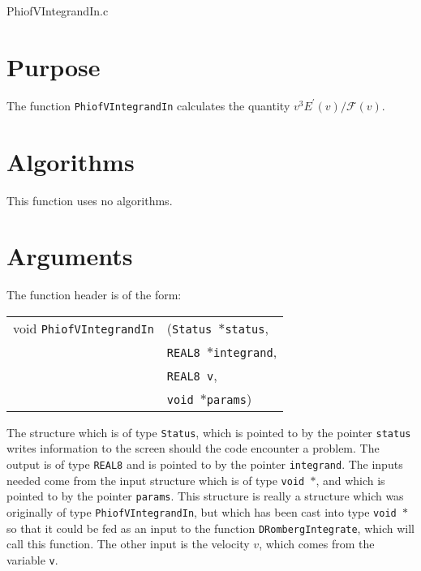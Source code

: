 \documentclass[12pt]{article}
\begin{document}
\huge
\begin{center}
PhiofVIntegrandIn.c
\end{center}
\normalsize
\vspace{10mm}

\section{Purpose}

The function \texttt{PhiofVIntegrandIn} calculates the quantity $v^{3} E^{\prime}(v)/\mathcal{F}(v)$.





\section{Algorithms}

This function uses no algorithms.


\section{Arguments}

The function header is of the form:

\vspace{5mm}

\begin{tabular}{ll}
void \texttt{PhiofVIntegrandIn}&(\texttt{Status $\ast$status},     \\
                                   &\texttt{REAL8 $\ast$integrand}, \\
                                   &\texttt{REAL8 v}, \\
                                   &\texttt{void $\ast$params})
\end{tabular}

\vspace{5mm}

The structure which is of type \texttt{Status}, which is pointed to by the pointer \texttt{status} writes information to the screen should the code encounter a problem. The output is of type \texttt{REAL8} and is pointed to by the pointer \texttt{integrand}. The inputs needed come from the input structure which is of type \texttt{void $\ast$}, and which is pointed to by the pointer \texttt{params}. This structure is really a structure which was originally of type \texttt{PhiofVIntegrandIn}, but which has been cast into type \texttt{void $\ast$} so that it could be fed as an input to the function \texttt{DRombergIntegrate}, which will call this function. The other input is the velocity $v$, which comes from the variable \texttt{v}. 
\end{document}
